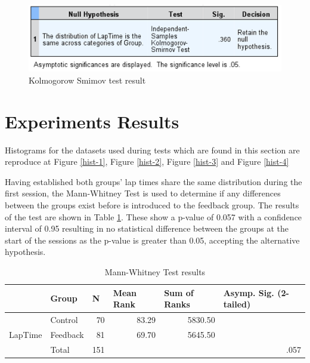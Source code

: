 \begin{figure}[!htb]
	\centering
	\includegraphics[width=\textwidth]{images/KolmogorowSmimov.png}
	\caption[Kolmogorow Smimov Test]{Kolmogorow Smimov test result}
	\label{fig:chart-KolmogorowSmimov}
\end{figure}

\section{Experiments Results}
\label{sec:eval-ExperimentsResults}

Histograms for the datasets used during tests which are found in this section are reproduce at Figure \ref{hist-1}, Figure \ref{hist-2}, Figure \ref{hist-3} and Figure \ref{hist-4}

Having established both groups' lap times share the same distribution during the first session, the Mann-Whitney Test is used to determine if any differences between the groups exist before \methodname is introduced to the feedback group. The results of the test are shown in Table \ref{table:Mann-Whitney}. These show a p-value of 0.057 with a confidence interval of 0.95 resulting in no statistical difference between the groups at the start of the sessions as the p-value is greater than 0.05, accepting the alternative hypothesis.

\begin{table}[!htb]
	\centering
	\begin{tabular}{|ll|r|rr|r|}
		\hline
		& Group    & \multicolumn{1}{l|}{N} & \multicolumn{1}{l|}{Mean Rank} & \multicolumn{1}{l|}{Sum of Ranks} & \multicolumn{1}{l|}{Asymp. Sig. (2-tailed)} \\ \hline
		\multicolumn{1}{|l|}{\multirow{3}{*}{LapTime}} & Control  & 70                     & \multicolumn{1}{r|}{83.29}     & 5830.50                           &                                             \\ \cline{2-5}
		\multicolumn{1}{|l|}{}                         & Feedback & 81                     & \multicolumn{1}{r|}{69.70}     & 5645.50                           &                                             \\ \cline{2-5}
		\multicolumn{1}{|l|}{}                         & Total    & 151                    &                                &                                   & .057                                        \\ \hline
	\end{tabular}
	\caption[Mann-Whitney Test results]{Mann-Whitney Test results}
	\label{table:Mann-Whitney}
\end{table}

